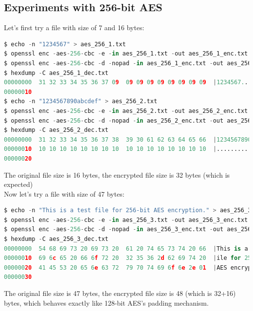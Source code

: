 \documentclass{article}
\begin{document}
\subsection{Experiments with 256-bit AES}
Let's first try a file with size of 7 and 16 bytes:
\begin{lstlisting}[language=Python]
$ echo -n "1234567" > aes_256_1.txt
$ openssl enc -aes-256-cbc -e -in aes_256_1.txt -out aes_256_1_enc.txt -K 00112233445566778889aabbccddeeff00112233445566778889aabbccddeeff -iv 0102030405060708090a0b0c0d0e0f10
$ openssl enc -aes-256-cbc -d -nopad -in aes_256_1_enc.txt -out aes_256_1_dec.txt -K 00112233445566778889aabbccddeeff00112233445566778889aabbccddeeff -iv 0102030405060708090a0b0c0d0e0f10
$ hexdump -C aes_256_1_dec.txt
00000000  31 32 33 34 35 36 37 09  09 09 09 09 09 09 09 09  |1234567.........|
00000010
$ echo -n "1234567890abcdef" > aes_256_2.txt
$ openssl enc -aes-256-cbc -e -in aes_256_2.txt -out aes_256_2_enc.txt -K 00112233445566778889aabbccddeeff00112233445566778889aabbccddeeff -iv 0102030405060708090a0b0c0d0e0f10
$ openssl enc -aes-256-cbc -d -nopad -in aes_256_2_enc.txt -out aes_256_2_dec.txt -K 00112233445566778889aabbccddeeff00112233445566778889aabbccddeeff -iv 0102030405060708090a0b0c0d0e0f10
$ hexdump -C aes_256_2_dec.txt
00000000  31 32 33 34 35 36 37 38  39 30 61 62 63 64 65 66  |1234567890abcdef|
00000010  10 10 10 10 10 10 10 10  10 10 10 10 10 10 10 10  |................|
00000020
\end{lstlisting}
The original file size is 16 bytes, the encrypted file size is 32 bytes (which is expected)\\
Now let's try a file with size of 47 bytes:
\begin{lstlisting}[language=Python]
$ echo -n "This is a test file for 256-bit AES encryption." > aes_256_3.txt
$ openssl enc -aes-256-cbc -e -in aes_256_3.txt -out aes_256_3_enc.txt -K 00112233445566778889aabbccddeeff00112233445566778889aabbccddeeff -iv 0102030405060708090a0b0c0d0e0f10
$ openssl enc -aes-256-cbc -d -nopad -in aes_256_3_enc.txt -out aes_256_3_dec.txt -K 00112233445566778889aabbccddeeff00112233445566778889aabbccddeeff -iv 0102030405060708090a0b0c0d0e0f10
$ hexdump -C aes_256_3_dec.txt
00000000  54 68 69 73 20 69 73 20  61 20 74 65 73 74 20 66  |This is a test f|
00000010  69 6c 65 20 66 6f 72 20  32 35 36 2d 62 69 74 20  |ile for 256-bit |
00000020  41 45 53 20 65 6e 63 72  79 70 74 69 6f 6e 2e 01  |AES encryption..|
00000030
\end{lstlisting}
The original file size is 47 bytes, the encrypted file size is 48 (which is 32+16) bytes, which behaves exactly like 128-bit AES's padding mechanism. \\
\end{document}
